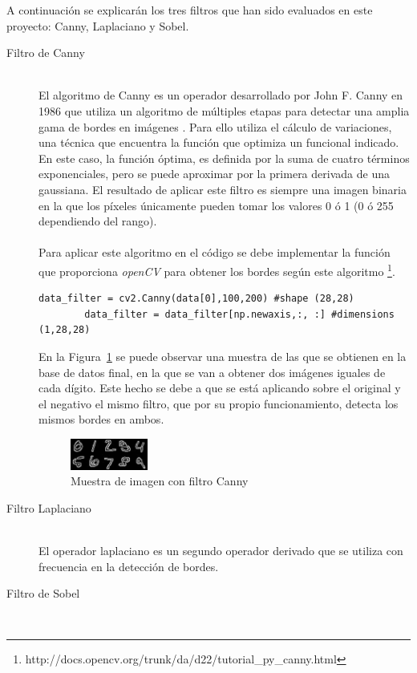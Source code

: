 A continuación se explicarán los tres filtros que han sido evaluados en este proyecto: Canny, Laplaciano y Sobel.\\

\begin{description}
	\item[Filtro de Canny] \hfill 
	\vspace{10pt}
	\\
	El algoritmo de Canny es un operador desarrollado por John F. Canny en 1986 que utiliza un algoritmo de múltiples etapas para detectar una amplia gama de bordes en imágenes \cite{4767851}. Para ello utiliza el cálculo de variaciones, una técnica que encuentra la función que optimiza un funcional indicado. En este caso, la función óptima, es definida por la suma de cuatro términos exponenciales, pero se puede aproximar por la primera derivada de una gaussiana. El resultado de aplicar este filtro es siempre una imagen binaria en la que los píxeles únicamente pueden tomar los valores 0 ó 1 (0 ó 255 dependiendo del rango).\\
	\vspace{-10pt}
	\\
	Para aplicar este algoritmo en el código se debe implementar la función que proporciona \textit{openCV} para obtener los bordes según este algoritmo \footnote{http://docs.opencv.org/trunk/da/d22/tutorial\_py\_canny.html}.
	\vspace{10pt}
	\begin{lstlisting}[frame=single]
		data_filter = cv2.Canny(data[0],100,200) #shape (28,28)
		data_filter = data_filter[np.newaxis,:, :] #dimensions (1,28,28)
	\end{lstlisting}
	En la Figura~\ref{fig.canny} se puede observar una muestra de las que se obtienen en la base de datos final, en la que se van a obtener dos imágenes iguales de cada dígito. Este hecho se debe a que se está aplicando sobre el original y el negativo el mismo filtro, que por su propio funcionamiento, detecta los mismos bordes en ambos.\\
	
	\begin{figure}[H]
		\begin{center}
			\includegraphics[width=0.25\textwidth]{figures/canny}
			\caption{Muestra de imagen con filtro Canny}
			\label{fig.canny}
		\end{center}
	\end{figure}
	
	\item[Filtro Laplaciano] \hfill 
	\vspace{10pt}
	\\
	El operador laplaciano es un segundo operador derivado que se utiliza con frecuencia en la detección de bordes. \cite{4135681}
	\item[Filtro de Sobel] \hfill 
	\vspace{10pt}
	\\
\end{description}

